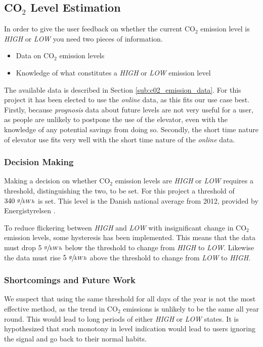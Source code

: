 \documentclass[Main]{subfiles}
\begin{document}
\subsection{CO$_2$ Level Estimation} %
\label{sub:co__2_level_estimation}

	In order to give the user feedback on whether the current CO$_2$ emission level is \emph{HIGH} or \emph{LOW} you need two pieces of information.

	\begin{itemize}
		\item Data on CO$_2$ emission levels
		\item Knowledge of what constitutes a \emph{HIGH} or \emph{LOW} emission level
	\end{itemize}

	The available data is described in Section \ref{sub:c02_emission_data}.
	For this project it has been elected to use the \emph{online} data, as this fits our use case best.
	Firstly, because \emph{prognosis} data about future levels are not very useful for a user, as people are unlikely to postpone the use of the elevator, even with the knowledge of any potential savings from doing so.
	Secondly, the short time nature of elevator use fits very well with the short time nature of the \emph{online} data.
 

	\subsubsection{Decision Making} %
	\label{sub:decision_making}

		Making a decision on whether CO$_2$ emission levels are \emph{HIGH} or \emph{LOW} requires a threshold, distinguishing the two, to be set.
		For this project a threshold of $340\ \sfrac{g}{kWh}$ is set.
		This level is the Danish national average from 2012, provided by Energistyrelsen \cite{Energistyrelsen:2012:Online}.

		To reduce flickering between \emph{HIGH} and \emph{LOW} with insignificant change in CO$_2$ emission levels, some hysteresis has been implemented.
		This means that the data must drop $5\ \sfrac{g}{kWh}$ below the threshold to change from \emph{HIGH} to \emph{LOW}.
		Likewise the data must rise $5\ \sfrac{g}{kWh}$ above the threshold to change from \emph{LOW} to \emph{HIGH}.
	


	\subsubsection{Shortcomings and Future Work} %
	\label{sub:shortcomings_and_future_work}
		We suspect that using the same threshold for all days of the year is not the most effective method, as the trend in CO$_2$ emissions is unlikely to be the same all year round.
		This would lead to long periods of either \emph{HIGH} or \emph{LOW} states.
		It is hypothesized that such monotony in level indication would lead to users ignoring the signal and go back to their normal habits.
\end{document}
